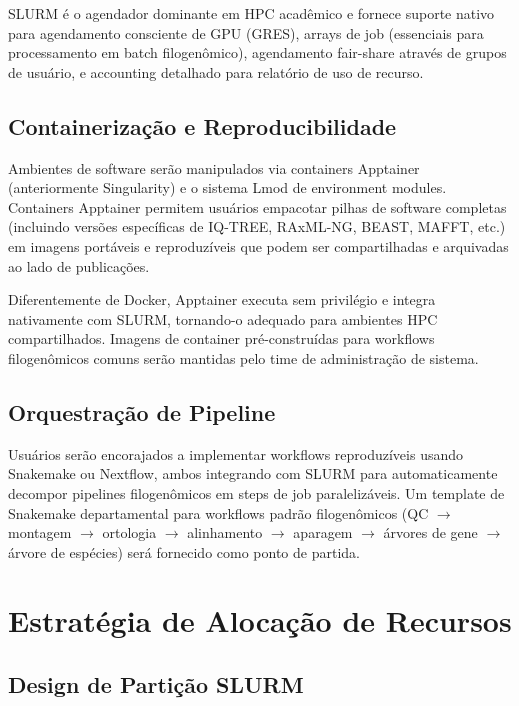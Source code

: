 SLURM é o agendador dominante em HPC acadêmico e fornece suporte nativo para agendamento consciente de GPU (GRES), arrays de job (essenciais para processamento em batch filogenômico), agendamento fair-share através de grupos de usuário, e accounting detalhado para relatório de uso de recurso.

\subsection{Containerização e Reproducibilidade}

Ambientes de software serão manipulados via containers Apptainer (anteriormente Singularity) e o sistema Lmod de environment modules. Containers Apptainer permitem usuários empacotar pilhas de software completas (incluindo versões específicas de IQ-TREE, RAxML-NG, BEAST, MAFFT, etc.) em imagens portáveis e reproduzíveis que podem ser compartilhadas e arquivadas ao lado de publicações.

Diferentemente de Docker, Apptainer executa sem privilégio e integra nativamente com SLURM, tornando-o adequado para ambientes HPC compartilhados. Imagens de container pré-construídas para workflows filogenômicos comuns serão mantidas pelo time de administração de sistema.

\subsection{Orquestração de Pipeline}

Usuários serão encorajados a implementar workflows reproduzíveis usando Snakemake \parencite{molder2021} ou Nextflow, ambos integrando com SLURM para automaticamente decompor pipelines filogenômicos em steps de job paralelizáveis. Um template de Snakemake departamental para workflows padrão filogenômicos (QC $\rightarrow$ montagem $\rightarrow$ ortologia $\rightarrow$ alinhamento $\rightarrow$ aparagem $\rightarrow$ árvores de gene $\rightarrow$ árvore de espécies) será fornecido como ponto de partida.

\section{Estratégia de Alocação de Recursos}

\subsection{Design de Partição SLURM}

